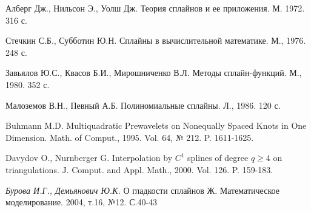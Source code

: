 \documentclass{spisok-article}
\begin{document}
\makeatletter\renewcommand{\refname}{\intl@references}\makeatother
\begin{thebibliography}{8}

  \item Алберг Дж., Нильсон Э., Уолш Дж. Теория сплайнов и ее приложения. М. 1972.
  316 с.

  \item Стечкин С.Б., Субботин Ю.Н. Сплайны в вычислительной
  математике. М., 1976. 248 с.

   \item  Завьялов Ю.С., Квасов Б.И., Мирошниченко В.Л. Методы
   сплайн-функций. М., 1980. 352 с.

  \item Малоземов В.Н., Певный А.Б. Полиномиальные сплайны. Л.,
    1986. 120 с.

  \item Buhmann M.D. Multiquadratic Prewavelets on Nonequally Spaced
     Knots in One Dimension. Math. of Comput., 1995. Vol. 64, № 212.
     P. 1611-1625.

  \item Davydov O., Nurnberger G. Interpolation by $C^1$ splines of
     degree $q\geq 4$ on triangulations. J. Comput. and Appl. Math.,
     2000.  Vol. 126. P. 159-183.

  \item {\it Бурова И.Г., Демьянович Ю.К.} О гладкости сплайнов
      Ж. Математическое моделирование. 2004, т.16, №12. С.40-43

\end{thebibliography}
\end{document}
